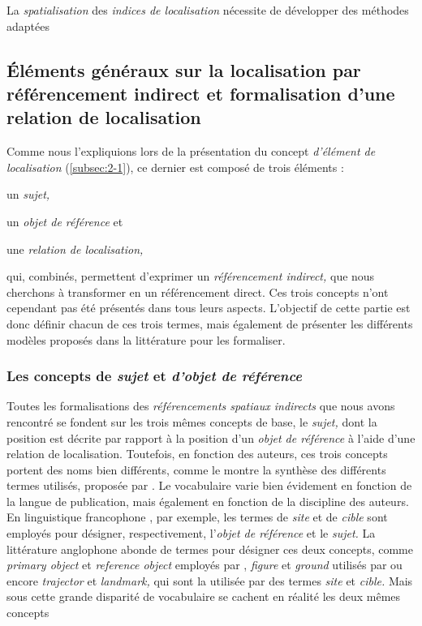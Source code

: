 
La \emph{spatialisation} des \emph{indices de localisation} nécessite
de développer des méthodes adaptées



\subsection{Éléments généraux sur la localisation par référencement
  indirect et formalisation d'une relation de localisation}

Comme nous l'expliquions lors de la présentation du concept
\emph{d'élément de localisation} (\autoref{subsec:2-1}), ce dernier
est composé de trois éléments :
%
\begin{enumerate*}[label=(\alph*)]
\item \label{i:site} un \emph{sujet,}
\item \label{i:cible} un \emph{objet de référence} et
\item une \emph{relation de localisation,}
\end{enumerate*}
%
qui, combinés, permettent d'exprimer un \emph{référencement indirect,}
que nous cherchons à transformer en un référencement direct. Ces trois
concepts n'ont cependant pas été présentés dans tous leurs
aspects. L'objectif de cette partie est donc définir chacun de ces
trois termes, mais également de présenter les différents modèles
proposés dans la littérature pour les formaliser.

\subsubsection{Les concepts de \emph{sujet} et \emph{d'objet de
    référence}}

Toutes les formalisations des \emph{référencements spatiaux indirects}
que nous avons rencontré se fondent sur les trois mêmes concepts de
base, le \emph{sujet,} dont la position est décrite par rapport à la
position d'un \emph{objet de référence} à l'aide d'une relation de
localisation. Toutefois, en fonction des auteurs, ces trois concepts
portent des noms bien différents, comme le montre la synthèse des
différents termes utilisés, proposée par
\textcite{RetzSchmidt1988}. Le vocabulaire varie bien évidement en
fonction de la langue de publication, mais également en fonction de la
discipline des auteurs. En linguistique francophone
\autocite{Vandeloise1986,Borillo1998, Aurnague1997, Mathet2000}, par
exemple, les termes de \emph{site} et de \emph{cible} sont employés
pour désigner, respectivement, l'\emph{objet de référence} et le
\emph{sujet.}
%
La littérature anglophone abonde de termes pour désigner ces deux
concepts, comme \emph{primary object} et \emph{reference object}
employés par \textcite{RetzSchmidt1988, Clementini2013}, \emph{figure}
et \emph{ground} utilisés par \textcite{Talmy1983} ou encore
\emph{trajector} et \emph{landmark,} qui sont la utilisée par
\textcite{Vandeloise1984} des termes \emph{site} et \emph{cible.}
%
Mais sous cette grande disparité de vocabulaire se cachent en réalité
les deux mêmes concepts

